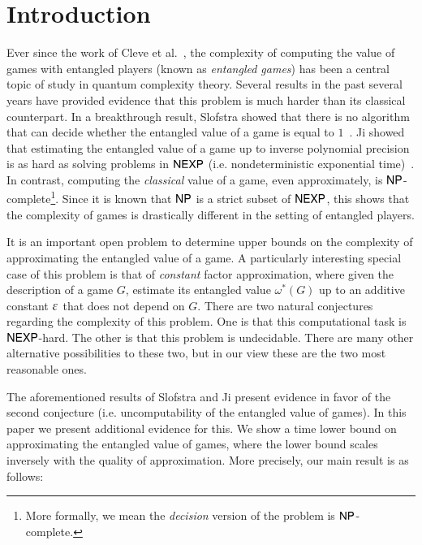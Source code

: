 \section{Introduction}

Ever since the work of Cleve et al.~\cite{cleve2004consequences}, the complexity of computing the value of games with entangled players (known as \emph{entangled games}) has been a central topic of study in quantum complexity theory. Several results in the past several years have provided evidence that this problem is much harder than its classical counterpart. In a breakthrough result, Slofstra showed that there is no algorithm that can decide whether the entangled value of a game is equal to $1$~\cite{slofstra2017set}. Ji showed that estimating the entangled value of a game up to inverse polynomial precision is as hard as solving problems in ${\sf NEXP}$ (i.e. nondeterministic exponential time)~\cite{ji2016compression}. In contrast, computing the \emph{classical} value of a game, even approximately, is ${\sf NP}$-complete\footnote{More formally, we mean the \emph{decision} version of the problem is ${\sf NP}$-complete.}. Since it is known that ${\sf NP}$ is a strict subset of ${\sf NEXP}$, this shows that the complexity of games is drastically different in the setting of entangled players. 

It is an important open problem to determine upper bounds on the complexity of approximating the entangled value of a game. A particularly interesting special case of this problem is that of \emph{constant} factor approximation, where given the description of a game $G$, estimate its entangled value $\omega^*(G)$ up to an additive constant $\varepsilon$ that does not depend on $G$. There are two natural conjectures regarding the complexity of this problem. One is that this computational task is ${\sf NEXP}$-hard. The other is that this problem is undecidable. There are many other alternative possibilities to these two, but in our view these are the two most reasonable ones. 

The aforementioned results of Slofstra and Ji present evidence in favor of the second conjecture (i.e. uncomputability of the entangled value of games). In this paper we present additional evidence for this. We show a time lower bound on approximating the entangled value of games, where the lower bound scales inversely with the quality of approximation. More precisely, our main result is as follows:

